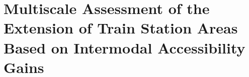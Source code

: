 
\chapter
{Multiscale Assessment of the Extension of Train Station Areas Based on Intermodal Accessibility Gains
    \label{chap5:titre}
    }
    \begin{refsegment}



\end{refsegment}
